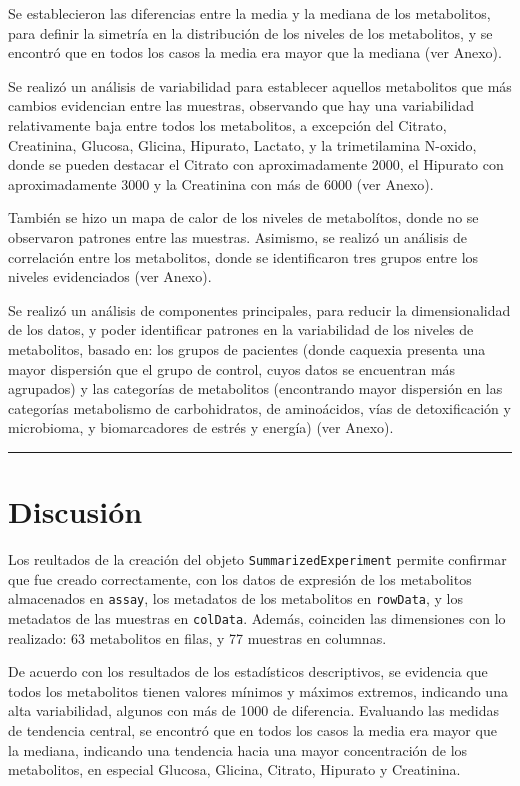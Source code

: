 \documentclass[
]{article}
\begin{document}
Se establecieron las diferencias entre la media y la mediana de los
metabolitos, para definir la simetría en la distribución de los niveles
de los metabolitos, y se encontró que en todos los casos la media era
mayor que la mediana (ver Anexo).

Se realizó un análisis de variabilidad para establecer aquellos
metabolitos que más cambios evidencian entre las muestras, observando
que hay una variabilidad relativamente baja entre todos los metabolitos,
a excepción del Citrato, Creatinina, Glucosa, Glicina, Hipurato,
Lactato, y la trimetilamina N-oxido, donde se pueden destacar el Citrato
con aproximadamente 2000, el Hipurato con aproximadamente 3000 y la
Creatinina con más de 6000 (ver Anexo).

También se hizo un mapa de calor de los niveles de metabolítos, donde no
se observaron patrones entre las muestras. Asimismo, se realizó un
análisis de correlación entre los metabolitos, donde se identificaron
tres grupos entre los niveles evidenciados (ver Anexo).

Se realizó un análisis de componentes principales, para reducir la
dimensionalidad de los datos, y poder identificar patrones en la
variabilidad de los niveles de metabolitos, basado en: los grupos de
pacientes (donde caquexia presenta una mayor dispersión que el grupo de
control, cuyos datos se encuentran más agrupados) y las categorías de
metabolitos (encontrando mayor dispersión en las categorías metabolismo
de carbohidratos, de aminoácidos, vías de detoxificación y microbioma, y
biomarcadores de estrés y energía) (ver Anexo).

\begin{center}\rule{0.5\linewidth}{0.5pt}\end{center}

\section{Discusión}\label{discusiuxf3n}

Los reultados de la creación del objeto \texttt{SummarizedExperiment}
permite confirmar que fue creado correctamente, con los datos de
expresión de los metabolitos almacenados en \texttt{assay}, los
metadatos de los metabolitos en \texttt{rowData}, y los metadatos de las
muestras en \texttt{colData}. Además, coinciden las dimensiones con lo
realizado: 63 metabolitos en filas, y 77 muestras en columnas.

De acuerdo con los resultados de los estadísticos descriptivos, se
evidencia que todos los metabolitos tienen valores mínimos y máximos
extremos, indicando una alta variabilidad, algunos con más de 1000 de
diferencia. Evaluando las medidas de tendencia central, se encontró que
en todos los casos la media era mayor que la mediana, indicando una
tendencia hacia una mayor concentración de los metabolitos, en especial
Glucosa, Glicina, Citrato, Hipurato y Creatinina.
\end{document}
